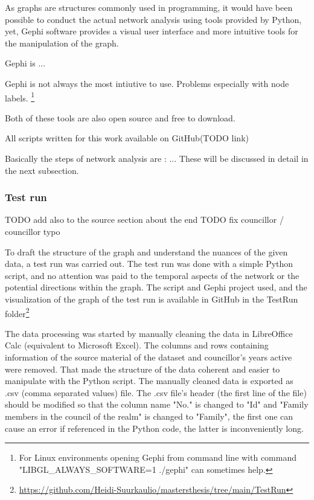 \documentclass[a4paper,12pt]{article}
\begin{document}
As graphs are structures commonly used in programming, it would have been possible to conduct the actual network analysis using tools provided by Python, yet, Gephi software provides a visual user interface and more intuitive tools for the manipulation of the graph.

Gephi is ...

Gephi is not always the most intiutive to use. Problems especially with node labels. \footnote{For Linux environments opening Gephi from command line with command "LIBGL\_ALWAYS\_SOFTWARE=1 ./gephi" can sometimes help.} 

Both of these tools are also open source and free to download.

All scripts written for this work available on GitHub(TODO link)

Basically the steps of network analysis are : ... These will be discussed in detail in the next subsection.

\subsubsection{Test run}
TODO add also to the source section about the end
TODO fix councillor / councillor typo

To draft the structure of the graph and understand the nuances of the given data, a test run was carried out. The test run was done with a simple Python script, and no attention was paid to the temporal aspects of the network or the potential directions within the graph. The script and Gephi project used, and the visualization of the graph of the test run is available in GitHub in the TestRun folder\footnote{\url{https://github.com/Heidi-Suurkaulio/mastersthesis/tree/main/TestRun}}

The data processing was started by manually cleaning the data in LibreOffice Calc (equivalent to Microsoft Excel). The columns and rows containing information of the source material of the dataset and councillor's years active were removed. That made the structure of the data coherent and easier to manipulate with the Python script. The manually cleaned data is exported as .csv (comma separated values) file. The .csv file's header (the first line of the file) should be modified so that the column name "No." is changed to "Id" and "Family members in the council of the realm" is changed to "Family", the first one can cause an error if referenced in the Python code, the latter is inconveniently long. 
\end{document}
